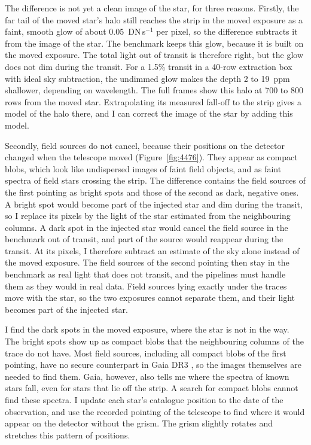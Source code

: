 The difference is not yet a clean image of the star, for three reasons.
Firstly, the far tail of the moved star's halo still reaches the strip in the
moved exposure as a faint, smooth glow of about
0.05~DN\,s$^{-1}$ per pixel, so the difference subtracts it from the image of
the star. The benchmark keeps this glow, because it is built on the moved exposure.
The total light out of transit is therefore right, but the glow does not
dim during the transit. For a 1.5\% transit in a 40-row extraction box with
ideal sky subtraction, the undimmed glow makes the depth 2 to 19~ppm shallower, depending
on wavelength. The full frames show this halo at 700 to 800 rows from the
moved star. Extrapolating its measured fall-off to the strip gives a model of
the halo there, and I can correct the image of the star by adding this model.

Secondly, field sources do not cancel, because their positions on the detector changed when the telescope moved
(Figure~\ref{fig:4476}). They appear as compact blobs, which look like
undispersed images of faint field objects, and as faint spectra of field
stars crossing the strip. The difference contains the field sources of the
first pointing as bright spots and those of the second as dark, negative ones.
A bright spot would become part of the injected star and dim during the
transit, so I replace its pixels by the light of the star estimated from the
neighbouring columns. A dark spot in the injected star would cancel the field source in the
benchmark out of transit, and part of the source would reappear during the
transit. At its pixels, I therefore subtract an estimate of the sky alone
instead of the moved exposure. The field sources of the second pointing then stay in the benchmark
as real light that does not transit, and the pipelines must handle them as
they would in real data. Field sources lying exactly under the traces move
with the star, so the two exposures cannot separate them, and their light
becomes part of the injected star.

I find the dark spots in the moved exposure, where the star is not in the
way. The bright spots show up as compact blobs that the neighbouring columns
of the trace do not have. Most field sources, including all compact blobs of the
first pointing, have no secure counterpart in Gaia DR3 \citep{GaiaDR3}, so the
images themselves are needed to find them. Gaia, however, also tells me where
the spectra of known stars fall, even for stars that lie off the strip. A
search for compact blobs cannot find these spectra. I update each star's catalogue
position to the date of the observation, and use the recorded pointing of the
telescope to find where it would appear on the detector without the grism.
The grism slightly rotates and stretches this pattern of positions.

